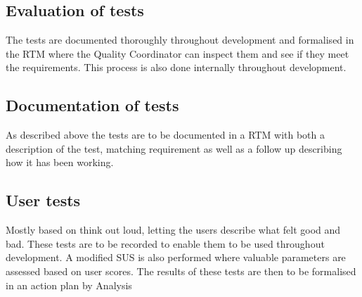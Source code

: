 \subsection{Evaluation of tests}
The tests are documented thoroughly throughout development and formalised in the RTM where the Quality Coordinator can inspect them and see if they meet the requirements. This process is also done internally throughout development.
\subsection{Documentation of tests}
As described above the tests are to be documented in a RTM with both a description of the test, matching requirement as well as a follow up describing how it has been working.

\subsection{User tests}
Mostly based on think out loud, letting the users describe what felt good and bad. These tests are to be recorded to enable them to be used throughout development. A modified SUS is also performed where valuable parameters are assessed based on user scores.
The results of these tests are then to be formalised in an action plan by Analysis

